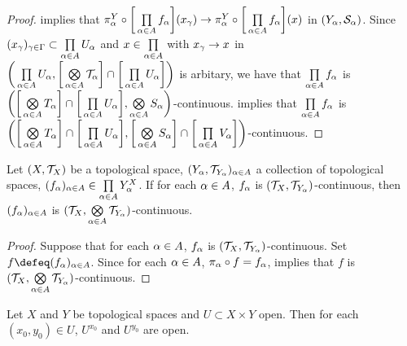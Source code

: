\documentclass{book}
\begin{document}
\begin{proof}
		 implies that $\pi^Y_{\alpha} \circ \bigg[ \prod\limits_{\alpha \in A}f_{\alpha} \bigg] (x_{\gamma}) \rightarrow \pi^Y_{\alpha} \circ \bigg[ \prod\limits_{\alpha \in A}f_{\alpha} \bigg] (x) $ in $(Y_{\alpha}, \mathcal{S}_{\alpha})$. Since $(x_{\gamma})_{\gamma \in \Gamma} \subset \prod\limits_{\alpha \in A} U_{\alpha}$ and $x \in \prod\limits_{\alpha \in A}$ with $x_{\gamma} \rightarrow x$ in $\bigg( \prod\limits_{\alpha \in A} U_{\alpha} , \bigg[ \bigotimes\limits_{\alpha \in A} \mathcal{T}_{\alpha} \bigg] \cap \bigg[ \prod\limits_{\alpha \in A} U_{\alpha} \bigg] \bigg)$ is arbitary, we have that $\prod\limits_{\alpha \in A}f_{\alpha}$ is $\bigg( \bigg[ \bigotimes\limits_{\alpha \in A} T_{\alpha} \bigg]  \cap \bigg[ \prod\limits_{\alpha \in A} U_{\alpha} \bigg], \bigotimes\limits_{\alpha \in A} S_{\alpha} \bigg)$-continuous.  implies that $\prod\limits_{\alpha \in A}f_{\alpha}$ is $\bigg( \bigg[ \bigotimes\limits_{\alpha \in A} T_{\alpha} \bigg]  \cap \bigg[ \prod\limits_{\alpha \in A} U_{\alpha} \bigg], \bigg[ \bigotimes\limits_{\alpha \in A} S_{\alpha} \bigg] \cap \bigg[ \prod\limits_{\alpha \in A} V_{\alpha} \bigg] \bigg)$-continuous.
	\end{proof}

	\begin{ex} 
		Let $(X, \mathcal{T}_X)$ be a topological space, $(Y_{\alpha}, \mathcal{T}_{Y_{\alpha}})_{\alpha \in A}$ a collection of topological spaces, $(f_{\alpha})_{\alpha \in A} \in \prod\limits_{\alpha \in A} Y_{\alpha}^X$. If for each $\alpha \in A$, $f_{\alpha}$ is $(\mathcal{T}_X, \mathcal{T}_{Y_{\alpha}})$-continuous, then $(f_{\alpha})_{\alpha \in A}$ is $(\mathcal{T}_X, \bigotimes\limits_{\alpha \in A} \mathcal{T}_{Y_{\alpha}})$-continuous.
	\end{ex}

	\begin{proof}
		Suppose that for each $\alpha \in A$, $f_{\alpha}$ is $(\mathcal{T}_X, \mathcal{T}_{Y_{\alpha}})$-continuous. Set $f \defeq (f_{\al})_{\al \in A}$. Since for each $\alpha \in A$, $\pi_{\alpha} \circ f = f_{\alpha}$,  implies that $f$ is $(\mathcal{T}_X, \bigotimes\limits_{\alpha \in A} \mathcal{T}_{Y_{\alpha}})$-continuous.
	\end{proof}




	\begin{defn}
	\end{defn}
	
	\begin{ex} 
		Let $X$ and $Y$ be topological spaces and $U \subset X \times Y$ open. Then for each $(x_0,  y_0) \in U$, $U^{x_0}$ and $U^{y_0}$ are open.
	\end{ex}
	
\end{document}
